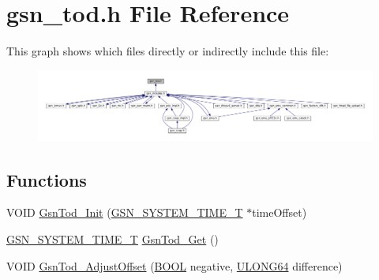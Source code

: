 \hypertarget{a00598}{
\section{gsn\_\-tod.h File Reference}
\label{a00598}
}
This graph shows which files directly or indirectly include this file:
\nopagebreak
\begin{figure}[H]
\begin{center}
\leavevmode
\includegraphics[width=400pt]{a00844}
\end{center}
\end{figure}
\subsection*{Functions}
\begin{DoxyCompactItemize}
\item 
VOID \hyperlink{a00598_a8630fbd6dc9c4e4710bac34629208a26}{GsnTod\_\-Init} (\hyperlink{a00673_gad1e755eb904493a09bf8df25a4519bf0}{GSN\_\-SYSTEM\_\-TIME\_\-T} $\ast$timeOffset)
\item 
\hyperlink{a00673_gad1e755eb904493a09bf8df25a4519bf0}{GSN\_\-SYSTEM\_\-TIME\_\-T} \hyperlink{a00598_a317c0fbf699170146590cde395aa8c14}{GsnTod\_\-Get} ()
\item 
VOID \hyperlink{a00598_ab7c7faec4ddf0e674a181ad7e969bb40}{GsnTod\_\-AdjustOffset} (\hyperlink{a00660_ga1f04022c0a182c51c059438790ea138c}{BOOL} negative, \hyperlink{a00660_ga28961430434ccabca6862ea93fe9a15b}{ULONG64} difference)
\end{DoxyCompactItemize}


